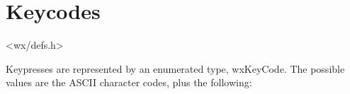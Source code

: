 
\section{Keycodes}\label{keycodes}


<wx/defs.h>

Keypresses are represented by an enumerated type, wxKeyCode. The possible
values are the ASCII character codes, plus the following:

